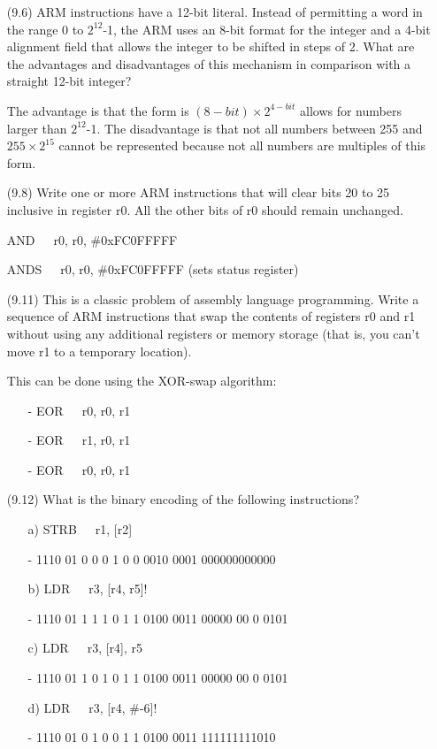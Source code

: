 \documentclass[letterpaper,10pt,titlepage]{article}
\begin{document}
\begin{enumerate}
	\item[(9.6)] ARM instructions have a 12-bit literal. Instead of permitting a word
		in the range 0 to $2^{12}$-1, the ARM uses an 8-bit format for the integer
		and a 4-bit alignment field that allows the integer to be shifted in steps
		of 2. What are the advantages and disadvantages of this mechanism in
		comparison with a straight 12-bit integer?
	\item[\textbullet] The advantage is that the form is $(8-bit) \times  2^{4-bit}$ 
		allows for numbers larger than $2^{12}$-1. The disadvantage is that
		not all numbers between 255 and $255 \times 2^{15}$ cannot be represented 
		because not all numbers are multiples of this form.

	\item[(9.8)] Write one or more ARM instructions that will clear bits 20 to 25
		inclusive in register r0. All the other bits of r0 should remain
		unchanged.
	\item[\textbullet] AND\ \ \ r0, r0, \#0xFC0FFFFF
	\item[\textbullet] ANDS\ \ \ r0, r0, \#0xFC0FFFFF (sets status register)

	\item[(9.11)] This is a classic problem of assembly language programming. Write a
		sequence of ARM instructions that swap the contents of registers r0 and r1
		without using any additional registers or memory storage (that is, you
		can't move r1 to a temporary location).
	\item[\textbullet] This can be done using the XOR-swap algorithm:
		\begin{enumerate}
			\item[-] EOR\ \ \ r0, r0, r1
			\item[-] EOR\ \ \ r1, r0, r1
			\item[-] EOR\ \ \ r0, r0, r1
		\end{enumerate}
	\item[(9.12)] What is the binary encoding of the following instructions?
		\begin{enumerate}
			\item[a)] STRB\ \ \ r1, [r2]
			\item[-] 1110 01 0 0 0 1 0 0 0010 0001 000000000000
			\item[b)] LDR\ \ \ r3, [r4, r5]!
			\item[-] 1110 01 1 1 1 0 1 1 0100 0011 00000 00 0 0101
			\item[c)] LDR\ \ \ r3, [r4], r5
			\item[-] 1110 01 1 0 1 0 1 1 0100 0011 00000 00 0 0101
			\item[d)] LDR\ \ \ r3, [r4, \#-6]!
			\item[-] 1110 01 0 1 0 0 1 1 0100 0011 111111111010
		\end{enumerate}


\end{enumerate}
\end{document}
